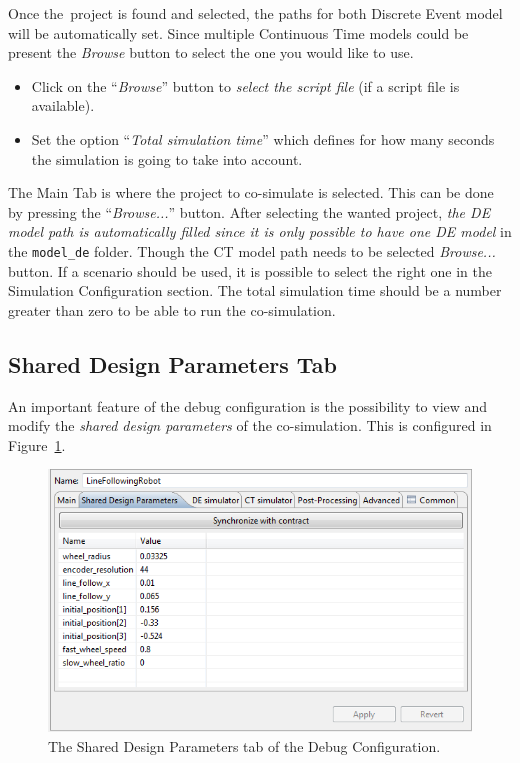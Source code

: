 \documentclass{crescendorepchap}
\begin{document}
Once the~project is found and selected, the paths for both Discrete
Event model will be automatically set. Since multiple Continuous Time
models could be present the \emph{Browse} button to select the one
you would like to use.

\begin{itemize}
\item
  Click on the ``\emph{Browse}'' button to \emph{select the script file}
  (if a script file is available).
\item
  Set the option ``\emph{Total simulation time}'' which defines for how 
  many seconds the simulation is going to take into account.
\end{itemize}

The Main Tab is where the project to co-simulate is selected. This can
be done by pressing the ``\emph{Browse...}'' button. After selecting the
wanted project, \emph{the DE model path is automatically filled
since it is only possible to have one DE model} in the \texttt{model\_de}
folder. Though the CT model path needs to be selected \emph{Browse...}
button. If a scenario should be used, it is possible
to select the right one in the Simulation Configuration section. The total
simulation time should be a number greater than zero to be able to run
the co-simulation.

\subsection{Shared Design Parameters Tab}

An important feature of the debug configuration is the possibility to
view and modify the \emph{shared design
parameters} of the co-simulation. This is configured in Figure~\ref{fig:sdpindebug}. 

\begin{figure}[htbp]
\centering
\includegraphics[width=.6\textwidth]{images/DestecsDebugConfigurationSDP.png}
\caption{The Shared Design Parameters tab of the Debug Configuration.\label{fig:sdpindebug}}
\end{figure}
\end{document}
